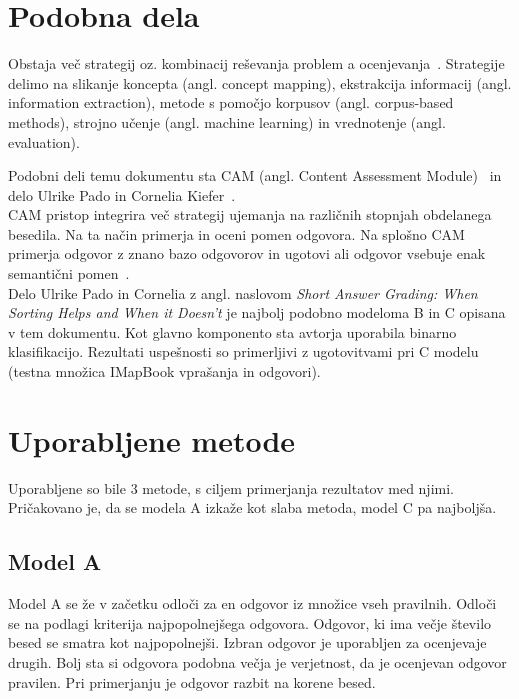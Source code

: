\documentclass[journal]{IEEEtran}
\begin{document}
\section{Podobna dela}
Obstaja več strategij oz. kombinacij reševanja problem a ocenjevanja~\cite{adhya2016automated}.
Strategije delimo na slikanje koncepta (angl. concept mapping), ekstrakcija informacij (angl. information extraction), metode s pomočjo korpusov (angl. corpus-based methods), strojno učenje (angl. machine learning) in vrednotenje (angl. evaluation).

Podobni deli temu dokumentu sta CAM (angl. Content Assessment Module)~\cite{bailey2008content} in delo Ulrike Pado in Cornelia Kiefer~\cite{Kiefer}.\\

CAM pristop integrira več strategij ujemanja na različnih stopnjah obdelanega besedila. Na ta način primerja in oceni pomen odgovora.
Na splošno CAM primerja odgovor z znano bazo odgovorov in ugotovi ali odgovor vsebuje enak semantični pomen~\cite{bailey2008diagnosing}.\\

Delo Ulrike Pado in Cornelia z angl. naslovom \textit{Short Answer Grading: When Sorting Helps and When it Doesn’t} je najbolj podobno modeloma B in C opisana v tem dokumentu. Kot glavno komponento sta avtorja uporabila binarno klasifikacijo. Rezultati uspešnosti so primerljivi z ugotovitvami pri C modelu (testna množica IMapBook vprašanja in odgovori).

\section{Uporabljene metode}
Uporabljene so bile 3 metode, s ciljem primerjanja rezultatov med njimi. Pričakovano je, da se modela A izkaže kot slaba metoda, model C pa najboljša.

\subsection{Model A}
Model A se že v začetku odloči za en odgovor iz množice vseh pravilnih. Odloči se na podlagi kriterija najpopolnejšega odgovora. Odgovor, ki ima večje število besed se smatra kot najpopolnejši.
Izbran odgovor je uporabljen za ocenjevaje drugih. Bolj sta si odgovora podobna večja je verjetnost, da je ocenjevan odgovor pravilen. Pri primerjanju je odgovor razbit na korene besed.
\end{document}
